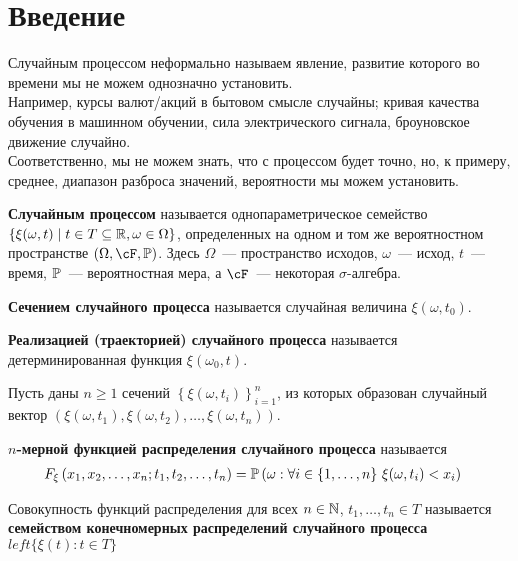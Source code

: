 \newpage
{}
\section{Введение}
Случайным процессом неформально называем явление, развитие которого во времени
мы не можем однозначно установить.
\\
Например, курсы валют/акций в бытовом смысле случайны; кривая качества обучения
в машинном обучении, сила электрического сигнала, броуновское движение случайно.
\\
Соответственно, мы не можем знать, что с процессом будет точно, но, к примеру,
среднее, диапазон разброса значений, вероятности мы можем установить.
\begin{Def}
    \textbf{Случайным процессом} называется однопараметрическое семейство
    $\left\{ \xi(\omega, t) \mid t \in T \subseteq \mathbb{R}, \omega \in \Omega
    \right\}$, определенных на одном и том же вероятностном пространстве $\left(
        \Omega, \cF, \PP \right)$. Здесь $\Omega$~--- пространство исходов,
    $\omega$~--- исход, $t$~--- время, $\mathbb{P}$~--- вероятностная мера, а $\cF$~---
    некоторая $\sigma$-алгебра.
\end{Def}
\begin{Def}
    \textbf{Сечением случайного процесса} называется случайная величина
    $\xi(\omega, t_0)$.
\end{Def}
\begin{Def}
    \textbf{Реализацией (траекторией) случайного процесса} называется
    детерминированная функция $\xi(\omega_0, t)$.
\end{Def}
Пусть даны $n\geq 1$ сечений $\left\{ \xi(\omega, t_i) \right\}_{i=1}^n$, из
которых образован случайный вектор $\left( \xi(\omega, t_1), \xi(\omega, t_2),
    \dots, \xi(\omega, t_n) \right)$.
\begin{Def}
    \textbf{$n$-мерной функцией распределения случайного процесса} называется
    \begin{align*}
      & F_\xi \left( x_1, x_2, \dots, x_n; t_1, t_2, \dots, t_n \right) = \mathbb{P}\left( \omega : \forall i \in \{1, \dots, n\} \ \xi(\omega, t_i) < x_i \right)
    \end{align*}
\end{Def}
\begin{Def}
    Совокупность функций распределения для всех $n \in \mathbb{N}$, $t_1, \dots, t_n
    \in T$ называется \textbf{семейством конечномерных распределений случайного
      процесса} $left\{\xi(t): t \in T\}$
\end{Def}
